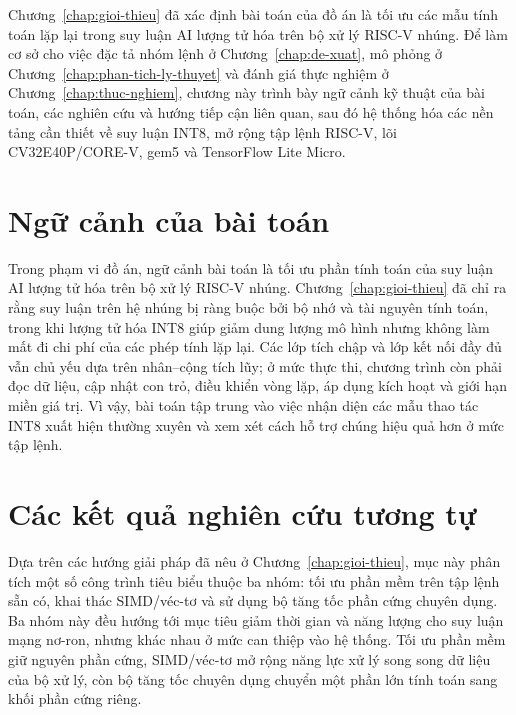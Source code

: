 \documentclass[../DoAn.tex]{subfiles}
\begin{document}
Chương~\ref{chap:gioi-thieu} đã xác định bài toán của đồ án là tối ưu các mẫu tính toán lặp lại trong suy luận AI lượng tử hóa trên bộ xử lý RISC-V nhúng. Để làm cơ sở cho việc đặc tả nhóm lệnh ở Chương~\ref{chap:de-xuat}, mô phỏng ở Chương~\ref{chap:phan-tich-ly-thuyet} và đánh giá thực nghiệm ở Chương~\ref{chap:thuc-nghiem}, chương này trình bày ngữ cảnh kỹ thuật của bài toán, các nghiên cứu và hướng tiếp cận liên quan, sau đó hệ thống hóa các nền tảng cần thiết về suy luận INT8, mở rộng tập lệnh RISC-V, lõi CV32E40P/CORE-V, gem5 và TensorFlow Lite Micro.

\section{Ngữ cảnh của bài toán}
\label{sec:ngu-canh-bai-toan}

Trong phạm vi đồ án, ngữ cảnh bài toán là tối ưu phần tính toán của suy luận AI lượng tử hóa trên bộ xử lý RISC-V nhúng. Chương~\ref{chap:gioi-thieu} đã chỉ ra rằng suy luận trên hệ nhúng bị ràng buộc bởi bộ nhớ và tài nguyên tính toán, trong khi lượng tử hóa INT8 giúp giảm dung lượng mô hình nhưng không làm mất đi chi phí của các phép tính lặp lại. Các lớp tích chập và lớp kết nối đầy đủ vẫn chủ yếu dựa trên nhân--cộng tích lũy; ở mức thực thi, chương trình còn phải đọc dữ liệu, cập nhật con trỏ, điều khiển vòng lặp, áp dụng kích hoạt và giới hạn miền giá trị. Vì vậy, bài toán tập trung vào việc nhận diện các mẫu thao tác INT8 xuất hiện thường xuyên và xem xét cách hỗ trợ chúng hiệu quả hơn ở mức tập lệnh.

\section{Các kết quả nghiên cứu tương tự}
\label{sec:nghien-cuu-tuong-tu}

Dựa trên các hướng giải pháp đã nêu ở Chương~\ref{chap:gioi-thieu}, mục này phân tích một số công trình tiêu biểu thuộc ba nhóm: tối ưu phần mềm trên tập lệnh sẵn có, khai thác SIMD/véc-tơ và sử dụng bộ tăng tốc phần cứng chuyên dụng. Ba nhóm này đều hướng tới mục tiêu giảm thời gian và năng lượng cho suy luận mạng nơ-ron, nhưng khác nhau ở mức can thiệp vào hệ thống. Tối ưu phần mềm giữ nguyên phần cứng, SIMD/véc-tơ mở rộng năng lực xử lý song song dữ liệu của bộ xử lý, còn bộ tăng tốc chuyên dụng chuyển một phần lớn tính toán sang khối phần cứng riêng.
\end{document}
